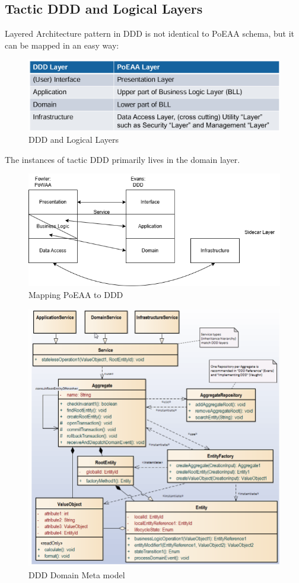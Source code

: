 \documentclass[../Main.tex]{subfiles}
\begin{document}
\subsection{Tactic DDD and Logical Layers}
Layered Architecture pattern in DDD is not identical to PoEAA schema, but
it can be mapped in an easy way:
\begin{figure}[H]
    \centering
    \includegraphics[width=1\linewidth]{Images/ddd-logical-layers.png}
    \caption{DDD and Logical Layers}
\end{figure}
The instances of tactic DDD primarily lives in the domain layer.
\begin{figure}[H]
    \centering
    \includegraphics[width=1\linewidth]{Images/mapping-poeaa-ddd.png}
    \caption{Mapping PoEAA to DDD}
\end{figure}

\begin{figure}[H]
    \centering
    \includegraphics[width=0.75\linewidth]{Images/ddd-meta-model.png}
    \caption{DDD Domain Meta model}
\end{figure}
\newpage
\end{document}
